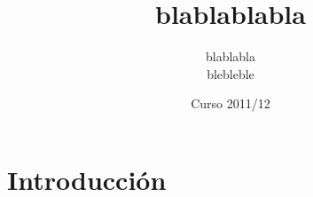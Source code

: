 \documentclass[a4paper,12pt,oneside]{book}
\title{blablablabla}
\author{blablabla \\
  blebleble}
\date{Curso 2011/12}
\begin{document}
\tableofcontents

\pagebreak

\chapter{Introducci\'on}
\end{document}
